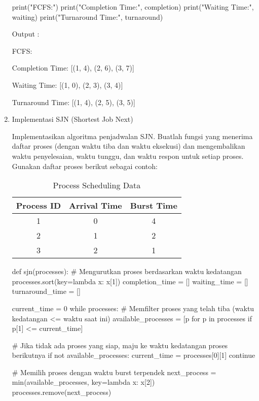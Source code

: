 \documentclass[12pt]{article}
\begin{document}
\begin{enumerate}
\begin{python}
print("FCFS:")
print("Completion Time:", completion)
print("Waiting Time:", waiting)
print("Turnaround Time:", turnaround)
\end{python}
        Output : 
        \par FCFS:
        \par Completion Time: [(1, 4), (2, 6), (3, 7)] 
        \par Waiting Time: [(1, 0), (2, 3), (3, 4)]
        \par Turnaround Time: [(1, 4), (2, 5), (3, 5)]
        
    \item Implementasi SJN (Shortest Job Next)
        \par  Implementasikan algoritma penjadwalan SJN. Buatlah fungsi yang menerima daftar proses (dengan waktu tiba dan waktu eksekusi) dan mengembalikan waktu penyelesaian, waktu tunggu, dan waktu respon untuk setiap proses. Gunakan daftar proses berikut sebagai contoh:
        \begin{table}[h!]
        \centering
        \begin{tabular}{|c|c|c|}
        \hline
        \textbf{Process ID} & \textbf{Arrival Time} & \textbf{Burst Time} \\ \hline
        1 & 0 & 4 \\ \hline
        2 & 1 & 2 \\ \hline
        3 & 2 & 1 \\ \hline
        \end{tabular}
        \caption{Process Scheduling Data}
        \end{table}
        
\begin{python}
def sjn(processes):
    # Mengurutkan proses berdasarkan waktu kedatangan
    processes.sort(key=lambda x: x[1]) 
    completion_time = []
    waiting_time = []
    turnaround_time = []
    
    current_time = 0
    while processes:
        # Memfilter proses yang telah tiba (waktu kedatangan <= waktu saat ini)
        available_processes = [p for p in processes if p[1] <= current_time]
        
        # Jika tidak ada proses yang siap, maju ke waktu kedatangan proses berikutnya
        if not available_processes:
            current_time = processes[0][1]
            continue
        
        # Memilih proses dengan waktu burst terpendek
        next_process = min(available_processes, key=lambda x: x[2])
        processes.remove(next_process)
        

\end{python}
\end{enumerate}
\end{document}
